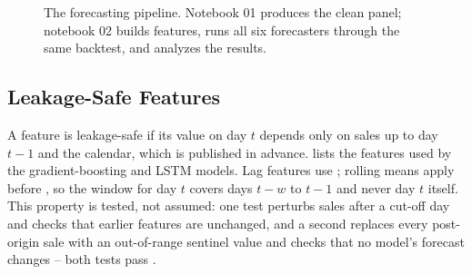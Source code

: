 \documentclass[conference]{IEEEtran}
\newcommand{\sig}[1]{\texttt{\detokenize{#1}}}
\begin{document}
\begin{figure}[t]
\centering
{}
\caption{The forecasting pipeline. Notebook 01 produces the clean panel; notebook 02 builds
features, runs all six forecasters through the same backtest, and analyzes the results.}
\label{fig:pipeline}
\end{figure}

\subsection{Leakage-Safe Features}
\label{sec:features}
A feature is leakage-safe if its value on day $t$ depends only on sales up to day $t-1$ and the
calendar, which is published in advance.  lists the features used by the
gradient-boosting and LSTM models. Lag features use \sig{shift(k)}; rolling means apply
\sig{shift(1)} before \sig{rolling(w)}, so the window for day $t$ covers days $t-w$ to $t-1$ and
never day $t$ itself. This property is tested, not assumed: one test perturbs sales after a cut-off
day and checks that earlier features are unchanged, and a second replaces every post-origin sale
with an out-of-range sentinel value and checks that no model's forecast changes -- both tests pass
\cite{kaufman2012}.
\end{document}
